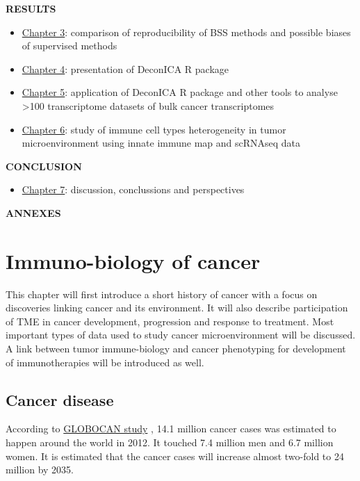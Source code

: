 \documentclass[12pt,]{book}
\providecommand{\tightlist}{%
  \setlength{\itemsep}{0pt}\setlength{\parskip}{0pt}}
\theoremstyle{definition}
\theoremstyle{definition}
\theoremstyle{definition}
\theoremstyle{remark}
\begin{document}
\textbf{RESULTS}

\begin{itemize}
\item
  \protect\hyperlink{sens}{Chapter 3}: comparison of reproducibility of
  BSS methods and possible biases of supervised methods
\item
  \protect\hyperlink{deconica}{Chapter 4}: presentation of DeconICA R
  package
\item
  \protect\hyperlink{results}{Chapter 5}: application of DeconICA R
  package and other tools to analyse \textgreater{}100 transcriptome
  datasets of bulk cancer transcriptomes
\item
  \protect\hyperlink{map}{Chapter 6}: study of immune cell types
  heterogeneity in tumor microenvironment using innate immune map and
  scRNAseq data
\end{itemize}

\textbf{CONCLUSION}

\begin{itemize}
\tightlist
\item
  \protect\hyperlink{conclusions}{Chapter 7}: discussion, conclussions
  and perspectives
\end{itemize}

\textbf{ANNEXES}

\hypertarget{intro}{%
\chapter{Immuno-biology of cancer}\label{intro}}

This chapter will first introduce a short history of cancer with a focus
on discoveries linking cancer and its environment. It will also describe
participation of TME in cancer development, progression and response to
treatment. Most important types of data used to study cancer
microenvironment will be discussed. A link between tumor immune-biology
and cancer phenotyping for development of immunotherapies will be
introduced as well.

\hypertarget{cancer-disease}{%
\section{Cancer disease}\label{cancer-disease}}

According to
\href{http://globocan.iarc.fr/Pages/fact_sheets_cancer.aspx}{GLOBOCAN
study} \citep{GLOBOCAN}, 14.1 million cancer cases was estimated to
happen around the world in 2012. It touched 7.4 million men and 6.7
million women. It is estimated that the cancer cases will increase
almost two-fold to 24 million by 2035.
\end{document}
